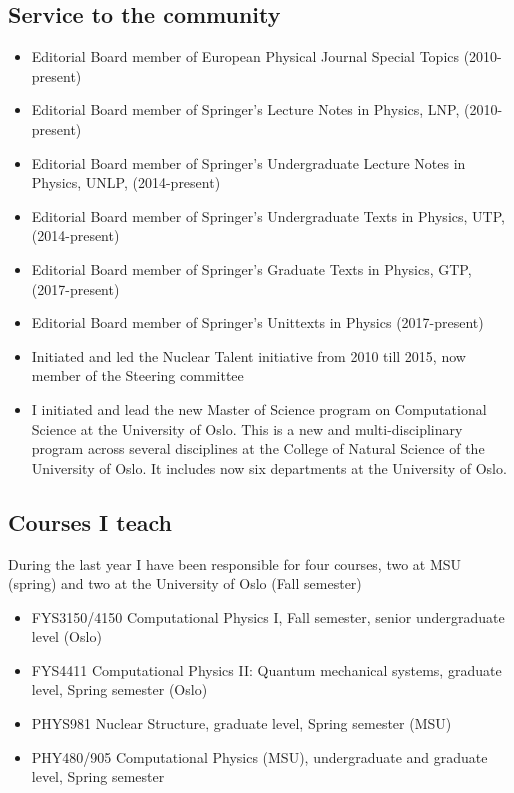 \documentclass[prc,amsart,english,twocolumn,superscriptaddress,showpacs,floatfix]{revtex4}
\begin{document}
 \subsection*{Service to the community}
\begin{itemize}


\item Editorial Board member of European Physical Journal Special Topics (2010-present)

\item Editorial Board member of Springer's Lecture Notes  in Physics, LNP,  (2010-present)

\item Editorial Board member of Springer's Undergraduate Lecture Notes in Physics, UNLP, (2014-present)

\item Editorial Board member of Springer's Undergraduate Texts in Physics, UTP,  (2014-present)

\item Editorial Board member of Springer's Graduate Texts in Physics, GTP,  (2017-present)

\item Editorial Board member of Springer's Unittexts in Physics (2017-present)


\item {Initiated and led the Nuclear Talent initiative from 2010 till 2015, now member of the Steering committee}

\item I initiated and lead the new {Master of Science program on Computational Science at the University of Oslo}. This is a new and multi-disciplinary program across several disciplines at the College of Natural Science of the University of Oslo. It includes now six departments at the University of Oslo.
\end{itemize}

\subsection*{Courses I teach}
During the last year I have been responsible for four courses, two at MSU (spring) and two at the University of Oslo (Fall semester)
\begin{itemize}
\item {FYS3150/4150 Computational Physics I}, Fall semester, senior undergraduate level (Oslo) 

\item {FYS4411 Computational Physics II: Quantum mechanical systems}, graduate level, Spring semester (Oslo) 

\item {PHYS981 Nuclear Structure}, graduate level, Spring semester (MSU) 

\item {PHY480/905 Computational Physics} (MSU), undergraduate and graduate level, Spring semester
\end{itemize}
\end{document}
